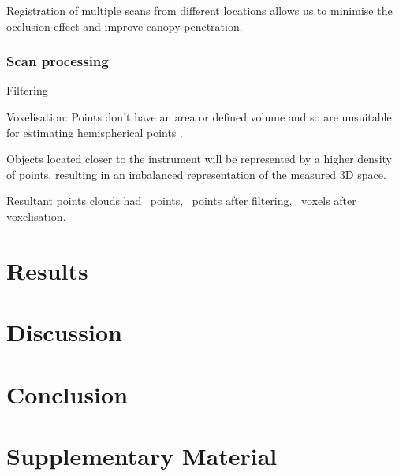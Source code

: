 \documentclass[11pt,a4paper]{article}
\newcommand{\beginsupplement}{%
	\setcounter{table}{0}
	\renewcommand{\thetable}{S\arabic{table}}%
	\setcounter{figure}{0}
	\renewcommand{\thefigure}{S\arabic{figure}}%
	}
\begin{document}
Registration of multiple scans from different locations allows us to minimise the occlusion effect and improve canopy penetration.

\subsubsection{Scan processing}

Filtering

Voxelisation: Points don't have an area or defined volume and so are unsuitable for estimating hemispherical points \citep{Seidel2012}.

Objects located closer to the instrument will be represented by a higher density of points, resulting in an imbalanced representation of the measured 3D space.

Resultant points clouds had ~points, ~points after filtering, ~voxels after voxelisation.

\section{Results}

\section{Discussion}

\section{Conclusion}

\printbibliography

\section{Supplementary Material}
\beginsupplement
\end{document}
